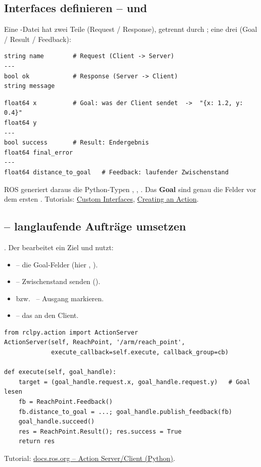 \subsection{Interfaces definieren --  und }
Eine -Datei hat zwei Teile (Request / Response), getrennt durch
\code{---}; eine  drei (Goal / Result / Feedback):
\begin{lstlisting}[style=bash,caption={\code{SetNamedPose.srv}}]
string name        # Request (Client -> Server)
---
bool ok            # Response (Server -> Client)
string message
\end{lstlisting}
\begin{lstlisting}[style=bash,caption={\code{ReachPoint.action}}]
float64 x          # Goal: was der Client sendet  ->  "{x: 1.2, y: 0.4}"
float64 y
---
bool success       # Result: Endergebnis
float64 final_error
---
float64 distance_to_goal   # Feedback: laufender Zwischenstand
\end{lstlisting}
\noindent ROS generiert daraus die Python-Typen ,
, . Das \textbf{Goal} sind genau
die Felder vor dem ersten \code{---}. Tutorials:
\href{https://docs.ros.org/en/jazzy/Tutorials/Beginner-Client-Libraries/Custom-ROS2-Interfaces.html}{Custom Interfaces},
\href{https://docs.ros.org/en/jazzy/Tutorials/Intermediate/Creating-an-Action.html}{Creating an Action}.

\subsection{ -- langlaufende Aufträge umsetzen}
.
Der  bearbeitet ein Ziel und nutzt:
\begin{itemize}
\item {} -- die Goal-Felder (hier , ).
\item {} -- Zwischenstand senden
  ().
\item {} bzw.\  -- Ausgang markieren.
\item {} -- das  an den Client.
\end{itemize}
\begin{lstlisting}[style=py,caption={Aufbau eines Action-Servers (vgl.\ Schritt 8)}]
from rclpy.action import ActionServer
ActionServer(self, ReachPoint, '/arm/reach_point',
             execute_callback=self.execute, callback_group=cb)

def execute(self, goal_handle):
    target = (goal_handle.request.x, goal_handle.request.y)   # Goal lesen
    fb = ReachPoint.Feedback()
    fb.distance_to_goal = ...; goal_handle.publish_feedback(fb)
    goal_handle.succeed()
    res = ReachPoint.Result(); res.success = True
    return res
\end{lstlisting}
\noindent Tutorial: \href{https://docs.ros.org/en/jazzy/Tutorials/Intermediate/Writing-an-Action-Server-Client/Py.html}{docs.ros.org -- Action Server/Client (Python)}.

